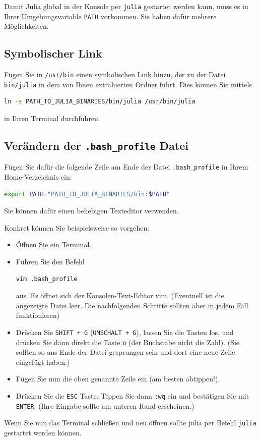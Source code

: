 \documentclass[11pt, a4paper]{scrartcl}
\begin{document}
	Damit Julia global in der Konsole per \texttt{julia} gestartet werden kann, muss es in Ihrer Umgebungsvariable \texttt{PATH} vorkommen. Sie haben dafür mehrere Möglichkeiten.
	
	
	\subsection{Symbolischer Link}
	
	Fügen Sie in \texttt{/usr/bin} einen symbolischen Link hinzu, der zu der Datei \texttt{bin/julia} in dem von Ihnen extrahierten Ordner führt. Dies können Sie mittels
		
	\begin{lstlisting}[language=bash, columns=fixed, breaklines=false]
	ln -s PATH_TO_JULIA_BINARIES/bin/julia /usr/bin/julia
	\end{lstlisting}
	
	in Ihren Terminal durchführen.
	
	 
	 
	\subsection{Verändern der \texttt{.bash\_profile} Datei}
	
	Fügen Sie dafür die folgende Zeile am Ende der Datei \texttt{.bash\_profile} in Ihrem Home-Verzeichnis ein:
	
	\begin{lstlisting}[language=bash, columns=fixed, breaklines=false]
	export PATH="PATH_TO_JULIA_BINARIES/bin:$PATH"
	\end{lstlisting}
	
	Sie können dafür einen beliebigen Texteditor verwenden.
	
	Konkret können Sie beispielsweise so vorgehen:
	
	\begin{itemize}
		\item Öffnen Sie ein Terminal.
		\item Führen Sie den Befehl 
		\begin{lstlisting}[language=bash, columns=fixed, breaklines=false]
		vim .bash_profile
		\end{lstlisting}
		aus. Es öffnet sich der Konsolen-Text-Editor vim. (Eventuell ist die angezeigte Datei leer. Die nachfolgenden Schritte sollten aber in jedem Fall funktionieren)
		\item Drücken Sie \texttt{SHIFT + G} (\texttt{UMSCHALT + G}), lassen Sie die Tasten los, und drücken Sie dann direkt die Taste \texttt{o} (der Buchstabe nicht die Zahl). (Sie sollten so ans Ende der Datei gesprungen sein und dort eine neue Zeile eingefügt haben.)
		\item Fügen Sie nun die oben genannte Zeile ein (am besten abtippen!).
		\item Drücken Sie die \texttt{ESC} Taste. Tippen Sie dann \texttt{:wq} ein und bestätigen Sie mit \texttt{ENTER}. (Ihre Eingabe sollte am unteren Rand erscheinen.)
	\end{itemize}
	
	Wenn Sie nun das Terminal schließen und neu öffnen sollte julia per Befehl \texttt{julia} gestartet werden können.
	
	
\end{document}
